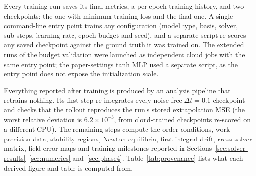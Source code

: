 Every training run saves its final metrics, a per-epoch training history, and
two checkpoints: the one with minimum training loss and the final one. A
single command-line entry point trains any configuration (model type, basis,
solver, sub-steps, learning rate, epoch budget and seed), and a separate
script re-scores any saved checkpoint against the ground truth it was
trained on. The extended runs of the budget validation were launched as
independent cloud jobs with the same entry point; the paper-settings tanh
MLP used a separate script, as the entry point does not expose the
initialization scale.

Everything reported after training is produced by an analysis pipeline that
retrains nothing. Its first step re-integrates every noise-free
$\Delta t=0.1$ checkpoint and checks that the rollout reproduces the run's
stored extrapolation MSE (the worst relative deviation is
$6.2\times10^{-3}$, from cloud-trained checkpoints re-scored on a different
CPU). The remaining steps compute the order conditions, work-precision data,
stability regions, Newton equilibria, first-integral drift, cross-solver
matrix, field-error maps and training milestones reported in
Sections~\ref{sec:solver-results}--\ref{sec:numerics} and~\ref{sec:phase4}.
Table~\ref{tab:provenance} lists what each derived figure and table is
computed from.

